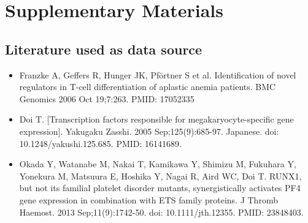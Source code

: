 \section*{Supplementary Materials}

\subsection*{Literature used as data source}
\begin{itemize}
    \item Franzke A, Geffers R, Hunger JK, Pförtner S et al. Identification of novel regulators in T-cell differentiation of aplastic anemia patients. BMC Genomics 2006 Oct 19;7:263. PMID: 17052335
    \item Doi T. [Transcription factors responsible for megakaryocyte-specific gene expression]. Yakugaku Zasshi. 2005 Sep;125(9):685-97. Japanese. doi: 10.1248/yakushi.125.685. PMID: 16141689.
    \item Okada Y, Watanabe M, Nakai T, Kamikawa Y, Shimizu M, Fukuhara Y, Yonekura M, Matsuura E, Hoshika Y, Nagai R, Aird WC, Doi T. RUNX1, but not its familial platelet disorder mutants, synergistically activates PF4 gene expression in combination with ETS family proteins. J Thromb Haemost. 2013 Sep;11(9):1742-50. doi: 10.1111/jth.12355. PMID: 23848403.
\end{itemize}

